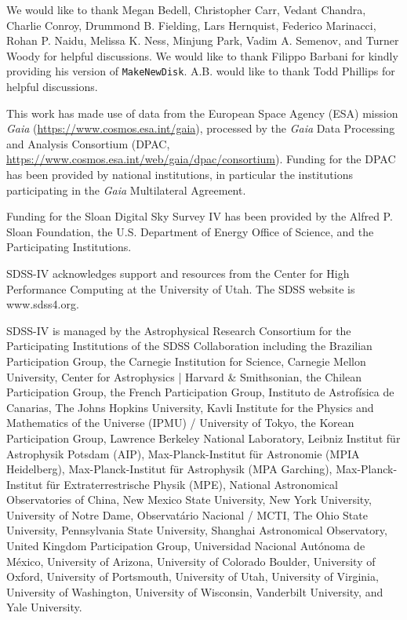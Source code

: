 \documentclass[twocolumn,linenumbers,trackchanges]{aastex631}
\begin{document}
\begin{acknowledgements}
We would like to thank Megan Bedell, Christopher Carr, Vedant Chandra, Charlie Conroy, Drummond B. Fielding, Lars Hernquist, Federico Marinacci, Rohan P. Naidu, Melissa K. Ness, Minjung Park, Vadim A. Semenov, and Turner Woody for helpful discussions. We would like to thank Filippo Barbani for kindly providing his version of \texttt{MakeNewDisk}. A.B. would like to thank Todd Phillips for helpful discussions.

This work has made use of data from the European Space Agency (ESA) mission {\it Gaia} (\url{https://www.cosmos.esa.int/gaia}), processed by the {\it Gaia} Data Processing and Analysis Consortium (DPAC, \url{https://www.cosmos.esa.int/web/gaia/dpac/consortium}). Funding for the DPAC has been provided by national institutions, in particular the institutions participating in the {\it Gaia} Multilateral Agreement.

Funding for the Sloan Digital Sky 
Survey IV has been provided by the 
Alfred P. Sloan Foundation, the U.S. 
Department of Energy Office of 
Science, and the Participating 
Institutions. 

SDSS-IV acknowledges support and 
resources from the Center for High 
Performance Computing  at the 
University of Utah. The SDSS 
website is www.sdss4.org.

SDSS-IV is managed by the 
Astrophysical Research Consortium 
for the Participating Institutions 
of the SDSS Collaboration including 
the Brazilian Participation Group, 
the Carnegie Institution for Science, 
Carnegie Mellon University, Center for 
Astrophysics | Harvard \& 
Smithsonian, the Chilean Participation 
Group, the French Participation Group, 
Instituto de Astrof\'isica de 
Canarias, The Johns Hopkins 
University, Kavli Institute for the 
Physics and Mathematics of the 
Universe (IPMU) / University of 
Tokyo, the Korean Participation Group, 
Lawrence Berkeley National Laboratory, 
Leibniz Institut f\"ur Astrophysik 
Potsdam (AIP),  Max-Planck-Institut 
f\"ur Astronomie (MPIA Heidelberg), 
Max-Planck-Institut f\"ur 
Astrophysik (MPA Garching), 
Max-Planck-Institut f\"ur 
Extraterrestrische Physik (MPE), 
National Astronomical Observatories of 
China, New Mexico State University, 
New York University, University of 
Notre Dame, Observat\'ario 
Nacional / MCTI, The Ohio State 
University, Pennsylvania State 
University, Shanghai 
Astronomical Observatory, United 
Kingdom Participation Group, 
Universidad Nacional Aut\'onoma 
de M\'exico, University of Arizona, 
University of Colorado Boulder, 
University of Oxford, University of 
Portsmouth, University of Utah, 
University of Virginia, University 
of Washington, University of 
Wisconsin, Vanderbilt University, 
and Yale University.

\end{acknowledgements}
\end{document}
